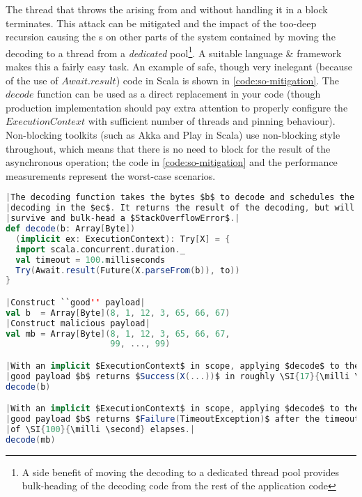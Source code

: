 The thread that throws the  arising from  and  without handling it in a  block terminates. This attack can be mitigated and the impact of the too-deep recursion causing the s on other parts of the system contained by moving the decoding to a thread from a \emph{dedicated} pool\footnote{A side benefit of moving the decoding to a dedicated thread pool provides bulk-heading of the decoding code from the rest of the application code}. A suitable language \& framework makes this a fairly easy task. An example of safe, though very inelegant (because of the use of $Await.result$) code in Scala is shown in \autoref{code:so-mitigation}. The $decode$ function can be used as a direct replacement in your code (though production implementation should pay extra attention to properly configure the $ExecutionContext$ with sufficient number of threads and pinning behaviour). Non-blocking toolkits (such as Akka\cite{akka} and Play\cite{play} in Scala) use non-blocking style throughout, which means that there is no need to block for the result of the asynchronous operation; the code in \autoref{code:so-mitigation} and the performance measurements represent the worst-case scenarios.

\begin{lstlisting}[caption={Stack Overflow Mitigation}, label={code:so-mitigation}, language=Scala, escapechar=|]
|The decoding function takes the bytes $b$ to decode and schedules the|
|decoding in the $ec$. It returns the result of the decoding, but will|
|survive and bulk-head a $StackOverflowError$.|
def decode(b: Array[Byte])
  (implicit ex: ExecutionContext): Try[X] = {
  import scala.concurrent.duration._
  val timeout = 100.milliseconds
  Try(Await.result(Future(X.parseFrom(b)), to))
}

|Construct ``good'' payload|
val b  = Array[Byte](8, 1, 12, 3, 65, 66, 67)
|Construct malicious payload|
val mb = Array[Byte](8, 1, 12, 3, 65, 66, 67, 
                     99, ..., 99)

|With an implicit $ExecutionContext$ in scope, applying $decode$ to the|
|good payload $b$ returns $Success(X(...))$ in roughly \SI{17}{\milli \second}.|
decode(b)

|With an implicit $ExecutionContext$ in scope, applying $decode$ to the|
|good payload $b$ returns $Failure(TimeoutException)$ after the timeout|
|of \SI{100}{\milli \second} elapses.|
decode(mb)
\end{lstlisting}


